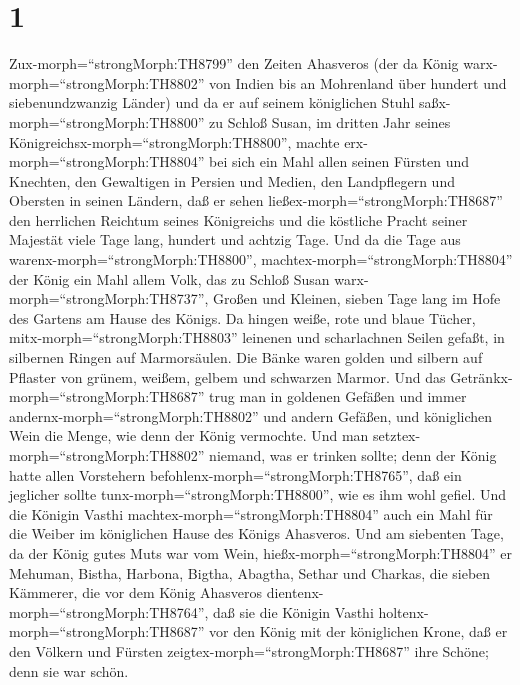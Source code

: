 \hypertarget{section}{%
\section{1}\label{section}}

 Zux-morph=``strongMorph:TH8799'' den Zeiten Ahasveros (der
da König warx-morph=``strongMorph:TH8802'' von Indien bis an Mohrenland
über hundert und siebenundzwanzig Länder)  und da er auf
seinem königlichen Stuhl saßx-morph=``strongMorph:TH8800'' zu Schloß
Susan,  im dritten Jahr seines
Königreichsx-morph=``strongMorph:TH8800'', machte
erx-morph=``strongMorph:TH8804'' bei sich ein Mahl allen seinen Fürsten
und Knechten, den Gewaltigen in Persien und Medien, den Landpflegern und
Obersten in seinen Ländern,  daß er sehen
ließex-morph=``strongMorph:TH8687'' den herrlichen Reichtum seines
Königreichs und die köstliche Pracht seiner Majestät viele Tage lang,
hundert und achtzig Tage.  Und da die Tage aus
warenx-morph=``strongMorph:TH8800'',
machtex-morph=``strongMorph:TH8804'' der König ein Mahl allem Volk, das
zu Schloß Susan warx-morph=``strongMorph:TH8737'', Großen und Kleinen,
sieben Tage lang im Hofe des Gartens am Hause des Königs. 
Da hingen weiße, rote und blaue Tücher,
mitx-morph=``strongMorph:TH8803'' leinenen und scharlachnen Seilen
gefaßt, in silbernen Ringen auf Marmorsäulen. Die Bänke waren golden und
silbern auf Pflaster von grünem, weißem, gelbem und schwarzen Marmor.
 Und das Getränkx-morph=``strongMorph:TH8687'' trug man in
goldenen Gefäßen und immer andernx-morph=``strongMorph:TH8802'' und
andern Gefäßen, und königlichen Wein die Menge, wie denn der König
vermochte.  Und man setztex-morph=``strongMorph:TH8802''
niemand, was er trinken sollte; denn der König hatte allen Vorstehern
befohlenx-morph=``strongMorph:TH8765'', daß ein jeglicher sollte
tunx-morph=``strongMorph:TH8800'', wie es ihm wohl gefiel. 
Und die Königin Vasthi machtex-morph=``strongMorph:TH8804'' auch ein
Mahl für die Weiber im königlichen Hause des Königs Ahasveros.
 Und am siebenten Tage, da der König gutes Muts war vom
Wein, hießx-morph=``strongMorph:TH8804'' er Mehuman, Bistha, Harbona,
Bigtha, Abagtha, Sethar und Charkas, die sieben Kämmerer, die vor dem
König Ahasveros dientenx-morph=``strongMorph:TH8764'',  daß
sie die Königin Vasthi holtenx-morph=``strongMorph:TH8687'' vor den
König mit der königlichen Krone, daß er den Völkern und Fürsten
zeigtex-morph=``strongMorph:TH8687'' ihre Schöne; denn sie war schön.
